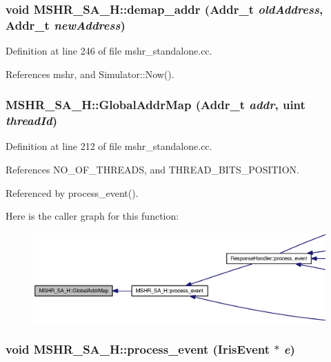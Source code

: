 \subsubsection[{demap\_\-addr}]{\setlength{\rightskip}{0pt plus 5cm}void MSHR\_\-SA\_\-H::demap\_\-addr ({\bf Addr\_\-t} {\em oldAddress}, \/  {\bf Addr\_\-t} {\em newAddress})}\label{classMSHR__SA__H_0723147a99bd7d6b1ee9b9cbd91cfffa}




Definition at line 246 of file mshr\_\-standalone.cc.

References mshr, and Simulator::Now().
\subsubsection[{GlobalAddrMap}]{ MSHR\_\-SA\_\-H::GlobalAddrMap ({\bf Addr\_\-t} {\em addr}, \/  {\bf uint} {\em threadId})}\label{classMSHR__SA__H_8dd530f7cdabd9a4198082f5538e902a}




Definition at line 212 of file mshr\_\-standalone.cc.

References NO\_\-OF\_\-THREADS, and THREAD\_\-BITS\_\-POSITION.

Referenced by process\_\-event().

Here is the caller graph for this function:\nopagebreak
\begin{figure}[H]
\begin{center}
\leavevmode
\includegraphics[width=420pt]{classMSHR__SA__H_8dd530f7cdabd9a4198082f5538e902a_icgraph}
\end{center}
\end{figure}
\subsubsection[{process\_\-event}]{\setlength{\rightskip}{0pt plus 5cm}void MSHR\_\-SA\_\-H::process\_\-event ({\bf IrisEvent} $\ast$ {\em e})}\label{classMSHR__SA__H_7258ebdeaf1a298f05ec66556233f16a}




